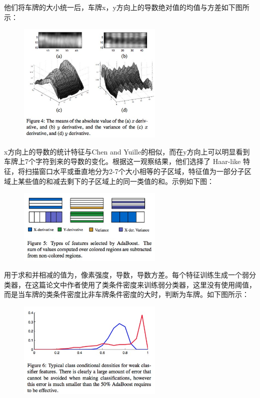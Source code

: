 他们将车牌的大小统一后，车牌x，y方向上的导数绝对值的均值与方差如下图所示：
\begin{figure}[H]
    \centering 
    \includegraphics[width=0.618\textwidth]{image/2_1_3_1.jpg}    
    \label{logic}
\end{figure}
x方向上的导数的统计特征与Chen and Yuille的相似，而在y方向上可以明显看到车牌上7个字符到来的导数的变化。根据这一观察结果，他们选择了 Haar-like 特征，将扫描窗口水平或垂直地分为2-7个大小相等的子区域，特征值为一部分子区域上某些值的和减去剩下的子区域上的同一类值的和。示例如下图：
\begin{figure}[H]
    \centering 
    \includegraphics[width=0.618\textwidth]{image/2_1_3_2.jpg}    
    \label{logic}
\end{figure}
用于求和并相减的值为，像素强度，导数，导数方差。每个特征训练生成一个弱分类器，在这篇论文中作者使用了类条件密度来训练弱分类器，这里没有使用阈值，而是当车牌的类条件密度比非车牌条件密度的大时，判断为车牌。如下图所示：
\begin{figure}[H]
    \centering 
    \includegraphics[width=0.618\textwidth]{image/2_1_3_3.jpg}    
    \label{logic}
\end{figure}
